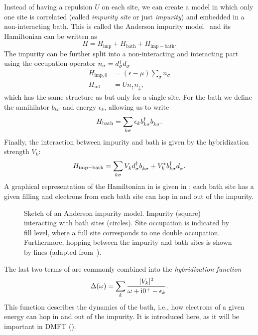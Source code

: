 Instead of having a repulsion $U$ on each site,
we can create a model in which only one site is correlated
(called \emph{impurity site} or just \emph{impurity})
and embedded in a non-interacting bath.
This is called the Anderson impurity model~\cite{Anderson1961}
and its Hamiltonian can be written as
\begin{equation}
    H = H_\mathrm{imp} + H_\mathrm{bath} + H_\mathrm{imp - bath}.
    \label{eq:H-Anderson}
\end{equation}
The impurity can be further split into a non-interacting and interacting part
using the occupation operator $n_\sigma = d^\dag_\sigma d^{\pdag}_\sigma$
\begin{align}
    H_{\mathrm{imp},0} & = (\epsilon - \mu) \sum_\sigma n_\sigma \\
    H_\mathrm{int}     & = U n_\uparrow n_\downarrow,
    \label{eq:H-Anderson-interaction}
\end{align}
which has the same structure as  but only for a single site.
For the bath we define the annihilator $b_{k\sigma}$ and energy $\epsilon_k$,
allowing us to write
\begin{equation}
    H_\mathrm{bath} = \sum_{k\sigma} \epsilon_k b^\dag_{k\sigma} b^{\pdag}_{k\sigma}.
    \label{eq:H-Anderson-bath}
\end{equation}
Finally, the interaction between impurity and bath is given by the hybridization strength $V_k$:
\begin{equation}
    H_\mathrm{imp - bath}
    =
    \sum_{k\sigma} V^{\ps}_k d^\dag_{\pk\sigma} b^{\pdag}_{k\sigma}
    + V_k^* b^\dag_{k\sigma} d^{\pdag}_{\pk\sigma}.
    \label{eq:H-Anderson-impurity-bath}
\end{equation}
A graphical representation of the Hamiltonian in  is given
in :
each bath site has a given filling
and electrons from each bath site can hop in and out of the impurity.
\begin{figure}[ht]
    \centering
    
    \caption{
        Sketch of an Anderson impurity model.
        Impurity (square) interacting with bath sites (circles).
        Site occupation is indicated by fill level,
        where a full site corresponds to one double occupation.
        Furthermore, hopping between the impurity and bath sites is shown by lines
        (adapted from~\cite{Lu2019}).
    }%
    \label{fig:AIM-geometry-star}
\end{figure}
The last two terms of  are commonly combined into the
\emph{hybridization function}
\begin{equation}
    \Delta(\omega) = \sum_{k} \frac{|V_k|^2}{\omega + \mathrm{i}0^+ - \epsilon_k}.
\end{equation}
This function describes the dynamics of the bath, i.e.,
how electrons of a given energy can hop in and out of the impurity.
It is introduced here,
as it will be important in DMFT ().

